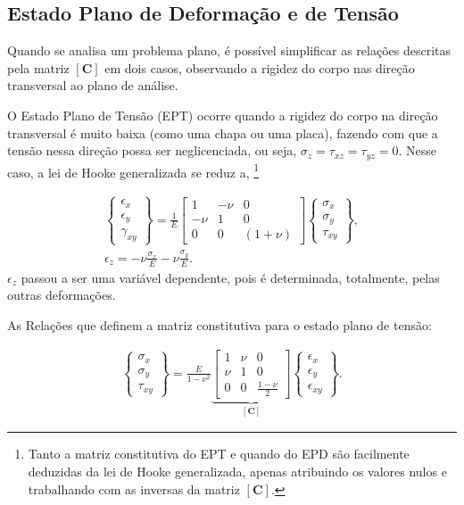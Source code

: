 \subsection{Estado Plano de Deformação e de Tensão}


Quando se analisa um problema plano, é possível simplificar as relações descritas pela matriz $[\bm{C}]$ em dois casos, observando a rigidez do corpo nas direção transversal ao plano de análise.

O Estado Plano de Tensão (EPT) ocorre quando a rigidez do corpo na direção transversal é muito baixa (como uma chapa ou uma placa), fazendo com que a tensão nessa direção possa ser neglicenciada, ou seja, $\sigma_z = \tau_{xz} = \tau_{yz} = 0$. Nesse caso, a lei de Hooke generalizada se reduz a, \footnote{Tanto a matriz constitutiva do EPT e quando do EPD são facilmente deduzidas da lei de Hooke generalizada, apenas atribuindo os valores nulos e trabalhando com as inversas da matriz $[\bm{C}]$.}

\begin{gather}
    \begin{Bmatrix}
        \epsilon_x \\
        \epsilon_y \\
        \gamma_{xy}
    \end{Bmatrix} = \frac{1}{E} \begin{bmatrix}
        1 & -\nu & 0 \\
        -\nu & 1 & 0 \\
        0 & 0 & (1+\nu)
    \end{bmatrix}
    \begin{Bmatrix}
        \sigma_x \\
        \sigma_y \\
        \tau_{xy}
    \end{Bmatrix}, \\
    \epsilon_z = -\nu \frac{\sigma_x}{E} - \nu \frac{\sigma_y}{E}.
\end{gather}
$\epsilon_z$ passou a ser uma variável dependente, pois é determinada, totalmente, pelas outras deformações. \cite[pág. 90]{Zin}

As Relações que definem a matriz constitutiva para o estado plano de tensão:

\begin{gather}
    \begin{Bmatrix}
        \sigma_x \\
        \sigma_y \\
        \tau_{xy}
    \end{Bmatrix} = \frac{E}{1-\nu^2} 
    \underbrace{\begin{bmatrix}
        1 & \nu & 0 \\
        \nu & 1 & 0 \\
        0 & 0 & \frac{1-\nu}{2}
    \end{bmatrix}}_{[\bm{C}]}
    \begin{Bmatrix}
        \epsilon_x \\
        \epsilon_y \\
        \epsilon_{xy}
    \end{Bmatrix}.
\end{gather}


